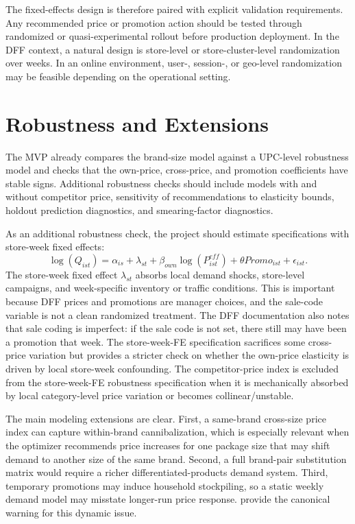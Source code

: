 \documentclass[11pt]{article}
\begin{document}
The fixed-effects design is therefore paired with explicit validation requirements. Any recommended price or promotion action should be tested through randomized or quasi-experimental rollout before production deployment. In the DFF context, a natural design is store-level or store-cluster-level randomization over weeks. In an online environment, user-, session-, or geo-level randomization may be feasible depending on the operational setting.

\section{Robustness and Extensions}

The MVP already compares the brand-size model against a UPC-level robustness model and checks that the own-price, cross-price, and promotion coefficients have stable signs. Additional robustness checks should include models with and without competitor price, sensitivity of recommendations to elasticity bounds, holdout prediction diagnostics, and smearing-factor diagnostics.

As an additional robustness check, the project should estimate specifications with store-week fixed effects:
\begin{equation}
\log(Q_{ist}) =
\alpha_{is}
+
\lambda_{st}
+
\beta_{own}\log(P^{eff}_{ist})
+
\theta Promo_{ist}
+
\epsilon_{ist}.
\end{equation}
The store-week fixed effect $\lambda_{st}$ absorbs local demand shocks, store-level campaigns, and week-specific inventory or traffic conditions. This is important because DFF prices and promotions are manager choices, and the sale-code variable is not a clean randomized treatment. The DFF documentation also notes that sale coding is imperfect: if the sale code is not set, there still may have been a promotion that week. The store-week-FE specification sacrifices some cross-price variation but provides a stricter check on whether the own-price elasticity is driven by local store-week confounding. The competitor-price index is excluded from the store-week-FE robustness specification when it is mechanically absorbed by local category-level price variation or becomes collinear/unstable.

The main modeling extensions are clear. First, a same-brand cross-size price index can capture within-brand cannibalization, which is especially relevant when the optimizer recommends price increases for one package size that may shift demand to another size of the same brand. Second, a full brand-pair substitution matrix would require a richer differentiated-products demand system. Third, temporary promotions may induce household stockpiling, so a static weekly demand model may misstate longer-run price response. \citet{hendel2006} provide the canonical warning for this dynamic issue.
\end{document}
